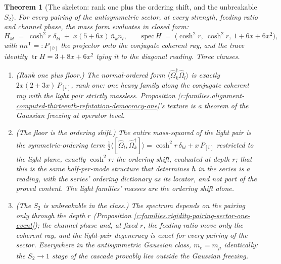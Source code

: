 \documentclass[11pt]{article}
\newtheorem{theorem}{Theorem}[section]
\theoremstyle{definition}
\theoremstyle{plain}
\providecommand{\tr}{}\renewcommand{\tr}{\operatorname{tr}}
\begin{document}
\begin{theorem}[The skeleton: rank one plus the ordering shift, and the unbreakable $S_{2}$]\label{c:families.skeleton-rank-one-plus-ordering-shift}
For every pairing of the antisymmetric sector, at every strength, feeding ratio and channel phase, the mass form evaluates in closed form:
\begin{equation}
H_{kl} \;=\; \cosh^{2}r\;\delta_{kl} \;+\; x(5+6x)\,\bar{n}_{k}n_{l},
\qquad
\mathrm{spec}\,H \;=\; \bigl(\cosh^{2}r,\ \cosh^{2}r,\ 1 + 6x + 6x^{2}\bigr),
\end{equation}
with $\bar{n}n^{\mathsf{T}} =: P_{[\bar{v}]}$ the projector onto the conjugate coherent ray, and the trace identity $\tr H = 3 + 8x + 6x^{2}$ tying it to the diagonal reading. Three clauses.
\begin{enumerate}
\item \emph{(Rank one plus floor.)} The normal-ordered form $\langle\hat\Omega_{k}^{\dagger}\hat\Omega_{l}\rangle$ is exactly $2x(2+3x)\,P_{[\bar v]}$, rank one: one heavy family along the conjugate coherent ray with the light pair strictly massless. Proposition \ref{c:families.alignment-computed-thirteenth-refutation-democracy-one}'s texture is a theorem of the Gaussian freezing at operator level.
\item \emph{(The floor is the ordering shift.)} The entire mass-squared of the light pair is the symmetric-ordering term $\tfrac12\langle[\hat\Omega_{l}, \hat\Omega_{k}^{\dagger}]\rangle = \cosh^{2}r\,\delta_{kl} + x\,P_{[\bar v]}$ restricted to the light plane, exactly $\cosh^{2}r$: the ordering shift, evaluated at depth $r$; that this is the same half-per-mode structure that determines $\hbar$ in the series is a reading, with the series' ordering dictionary \cite[Thm.~5.7]{ButlerT9} as its locator, and not part of the proved content. The light families' masses are the ordering shift alone.
\item \emph{(The $S_{2}$ is unbreakable in the class.)} The spectrum depends on the pairing only through the depth $r$ (Proposition \ref{c:families.rigidity-pairing-sector-one-event}); the channel phase and, at fixed $r$, the feeding ratio move only the coherent ray, and the light-pair degeneracy is exact for every pairing of the sector. Everywhere in the antisymmetric Gaussian class, $m_{e} = m_{\mu}$ identically: the $S_{2} \to 1$ stage of the cascade provably lies outside the Gaussian freezing.
\end{enumerate}
\end{theorem}
\end{document}
